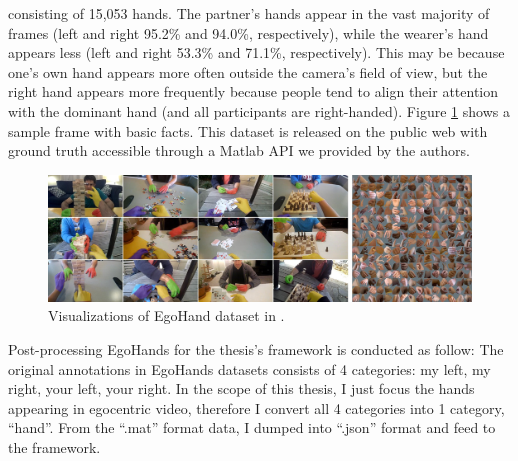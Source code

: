 consisting of 15,053 hands. The partner's hands appear in the vast majority of frames (left and right 95.2\% and 94.0\%, respectively), while the wearer's hand appears less (left and right 53.3\% and 71.1\%, respectively). This may be because one's own hand appears more often outside the camera's field of view, but the right hand appears more frequently because people tend to align their attention with the dominant hand (and all participants are right-handed). Figure \ref{fig:egohands} shows a sample frame with basic facts. This dataset is released on the public web with ground truth accessible through a Matlab API we provided by the authors.
\begin{figure}[!htb]
	\centerline{\includegraphics[width=1\linewidth]{Figs/egohands.jpg}}
	\caption{Visualizations of EgoHand dataset in \cite{10.1109/ICCV.2015.226}.}
	\label{fig:egohands}
\end{figure}
Post-processing EgoHands for the thesis’s framework is conducted as follow: The original annotations in EgoHands datasets consists of 4 categories: my left, my right, your left, your right. In the scope of this thesis, I just focus the hands appearing in egocentric video, therefore I convert all 4 categories into 1 category, “hand”. From the “.mat” format data, I dumped into “.json” format and feed to the framework.
